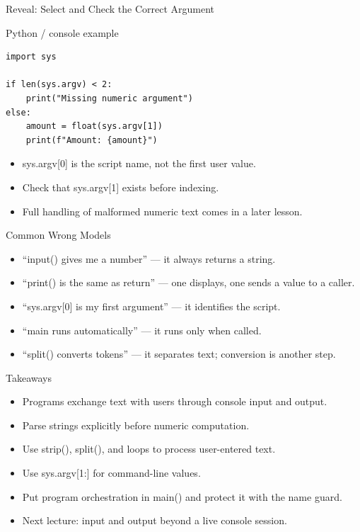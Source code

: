 \documentclass[aspectratio=169,10pt]{beamer}
\begin{document}
\begin{frame}[fragile]{Reveal: Select and Check the Correct Argument}
\begin{block}{Python / console example}\begin{Verbatim}[fontsize=\footnotesize]
import sys

if len(sys.argv) < 2:
    print("Missing numeric argument")
else:
    amount = float(sys.argv[1])
    print(f"Amount: {amount}")
\end{Verbatim}
\end{block}
\begin{itemize}
\item sys.argv[0] is the script name, not the first user value.
\item Check that sys.argv[1] exists before indexing.
\item Full handling of malformed numeric text comes in a later lesson.
\end{itemize}
\end{frame}
\begin{frame}[fragile]{Common Wrong Models}
\begin{itemize}
\item “input() gives me a number” — it always returns a string.
\item “print() is the same as return” — one displays, one sends a value to a caller.
\item “sys.argv[0] is my first argument” — it identifies the script.
\item “main runs automatically” — it runs only when called.
\item “split() converts tokens” — it separates text; conversion is another step.
\end{itemize}
\end{frame}
\begin{frame}[fragile]{Takeaways}
\begin{itemize}
\item Programs exchange text with users through console input and output.
\item Parse strings explicitly before numeric computation.
\item Use strip(), split(), and loops to process user-entered text.
\item Use sys.argv[1:] for command-line values.
\item Put program orchestration in main() and protect it with the name guard.
\item Next lecture: input and output beyond a live console session.
\end{itemize}
\end{frame}
\end{document}
